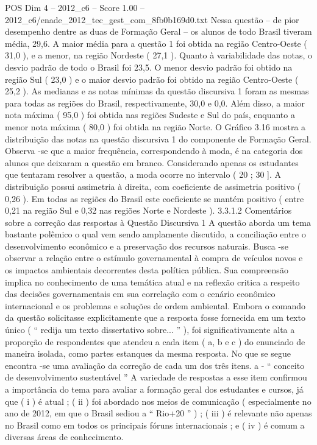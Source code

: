 \begin{textsample}{POS Dim 4 – 2012\_c6 – Score 1.00 – 2012\_c6/enade\_2012\_tec\_gest\_com\_8fb0b169d0.txt}
Nessa questão – de pior desempenho dentre as duas de Formação Geral – os alunos de todo Brasil tiveram média, 29,6.
A maior média para a questão 1 foi obtida na região Centro-Oeste ( 31,0 ), e a menor, na região Nordeste ( 27,1 ).
Quanto à variabilidade das notas, o desvio padrão de todo o Brasil foi 23,5.
O menor desvio padrão foi obtido na região Sul ( 23,0 ) e o maior desvio padrão foi obtido na região Centro-Oeste ( 25,2 ).
As medianas e as notas mínimas da questão discursiva 1 foram as mesmas para todas as regiões do Brasil, respectivamente, 30,0 e 0,0.
Além disso, a maior nota máxima ( 95,0 ) foi obtida nas regiões Sudeste e Sul do país, enquanto a menor nota máxima ( 80,0 ) foi obtida na região Norte.
O Gráfico 3.16 mostra a distribuição das notas na questão discursiva 1 do componente de Formação Geral.
Observa -se que a maior frequência, correspondendo à moda, é na categoria dos alunos que deixaram a questão em branco.
Considerando apenas os estudantes que tentaram resolver a questão, a moda ocorre no intervalo ( 20 ; 30 ].
A distribuição possui assimetria à direita, com coeficiente de assimetria positivo ( 0,26 ).
Em todas as regiões do Brasil este coeficiente se mantém positivo ( entre 0,21 na região Sul e 0,32 nas regiões Norte e Nordeste ). 3.3.1.2 Comentários sobre a correção das respostas à Questão Discursiva 1 A questão aborda um tema bastante polêmico o qual vem sendo amplamente discutido, a conciliação entre o desenvolvimento econômico e a preservação dos recursos naturais.
Busca -se observar a relação entre o estímulo governamental à compra de veículos novos e os impactos ambientais decorrentes desta política pública.
Sua compreensão implica no conhecimento de uma temática atual e na reflexão critica a respeito das decisões governamentais em sua correlação com o cenário econômico internacional e os problemas e soluções de ordem ambiental.
Embora o comando da questão solicitasse explicitamente que a resposta fosse fornecida em um texto único ( “ redija um texto dissertativo sobre... ” ), foi significativamente alta a proporção de respondentes que atendeu a cada item ( a, b e c ) do enunciado de maneira isolada, como partes estanques da mesma resposta.
No que se segue encontra -se uma avaliação da correção de cada um dos três itens. a - “ conceito de desenvolvimento sustentável ” A variedade de respostas a esse item confirmou a importância do tema para avaliar a formação geral dos estudantes e cursos, já que ( i ) é atual ; ( ii ) foi abordado nos meios de comunicação ( especialmente no ano de 2012, em que o Brasil sediou a “ Rio+20 ” ) ; ( iii ) é relevante não apenas no Brasil como em todos os principais fóruns internacionais ; e ( iv ) é comum a diversas áreas de conhecimento.

\end{textsample}
